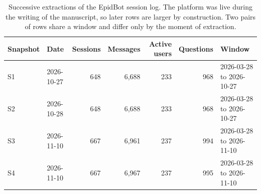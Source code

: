 \begin{table}[htbp]
\centering
\caption{Successive extractions of the EpidBot session log. The platform was
live during the writing of the manuscript, so later rows are larger by
construction. Two pairs of rows share a window and differ only by the moment
of extraction.}
\label{tab:s2}
\begin{tabular}{llrrrrl}
\toprule
Snapshot & Date & Sessions & Messages & Active users & Questions & Window \\
\midrule
S1 & 2026-10-27 & 648 & 6,688 & 233 & 968 & 2026-03-28 to 2026-10-27 \\
S2 & 2026-10-28 & 648 & 6,688 & 233 & 968 & 2026-03-28 to 2026-10-27 \\
S3 & 2026-11-10 & 667 & 6,961 & 237 & 994 & 2026-03-28 to 2026-11-10 \\
S4 & 2026-11-10 & 667 & 6,967 & 237 & 995 & 2026-03-28 to 2026-11-10 \\
\bottomrule
\end{tabular}
\end{table}
